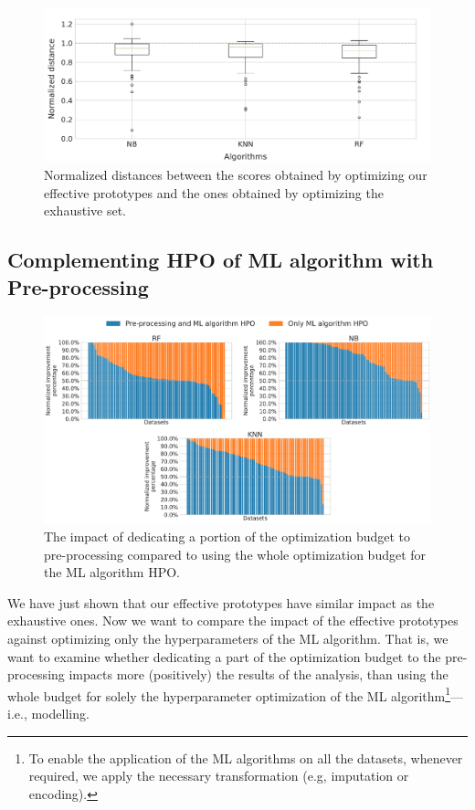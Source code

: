 \begin{figure}[!t]
    \centering
    \includegraphics[width=1.0\textwidth]{chapters/data-centric/supervised/img/evaluation2.pdf}
    \caption{Normalized distances between the scores obtained by optimizing our effective prototypes and the ones obtained by optimizing the exhaustive set.}
    \label{effective-fig:eval-exhaustive-vs-effective}
\end{figure}

\subsection{Complementing HPO of ML algorithm with Pre-processing}
\label{effective-sec:eval-dpso-vs-cash}

\begin{figure}[!t]
	\centering
	\includegraphics[width=1.0\textwidth]{chapters/data-centric/supervised/img/barplot-10.pdf}
	\caption{The impact of dedicating a portion of the optimization budget to pre-processing compared to using the whole optimization budget for the ML algorithm HPO.}
	\label{effective-fig:eval-pre-processing-hyperparameter}
\end{figure}

We have just shown that our effective prototypes have similar impact as the exhaustive ones.
Now we want to compare the impact of the effective prototypes against optimizing only the hyperparameters of the ML algorithm.
That is, we want to examine whether dedicating a part of the optimization budget to the pre-processing impacts more (positively) the results of the analysis, than using the whole budget for solely the hyperparameter optimization of the ML algorithm\footnote{To enable the application of the ML algorithms on all the datasets, whenever required, we apply the necessary transformation (e.g, imputation or encoding).}---i.e., modelling.

